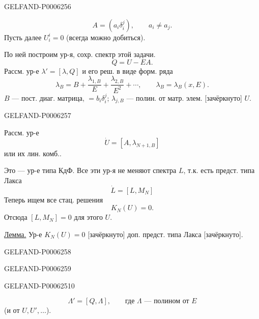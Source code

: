 \begin{GelfandAdjacentEvidence}{GELFAND-P000625}{6}

\[
A=(a_i\delta_i^j),\qquad a_i\ne a_j.
\]
Пусть далее \(U_i^i=0\) (всегда можно добиться).

По ней построим ур-я, сохр. спектр этой задачи.
\[
Q=U-EA.
\]
Рассм. ур-е \(\lambda'=[\lambda,Q]\) и его реш. в виде форм. ряда
\begin{equation*}
\lambda_B=B+\frac{\lambda_{1,B}}{E}+\frac{\lambda_{2,B}}{E^2}+\cdots,
\qquad\lambda_B=\lambda_B(x,E).\tag{3}
\end{equation*}
\(B\) --- пост. диаг. матрица, \(=b_i\delta_i^j\);
\(\lambda_{j,B}\) --- полин. от матр. элем. [зачёркнуто] \(U\).
\end{GelfandAdjacentEvidence}
\begin{GelfandAdjacentEvidence}{GELFAND-P000625}{7}


Рассм. ур-е
\begin{equation*}
\dot U=[A,\lambda_{N+1,B}]\tag{4}
\end{equation*}
или их лин. комб..

Это --- ур-е типа КдФ.
Все эти ур-я не меняют спектра \(L\), т.к. есть предст. типа Лакса
\begin{equation*}
\dot L=[L,M_N]\tag{5}
\end{equation*}
Теперь ищем все стац. решения
\begin{equation*}
K_N(U)=0.\tag{6}
\end{equation*}
Отсюда \([L,M_N]=0\) для этого \(U\).

\underline{Лемма.}
Ур-е \(K_N(U)=0\) [зачёркнуто] доп. предст. типа Лакса [зачёркнуто].
\end{GelfandAdjacentEvidence}
\begin{GelfandAdjacentEvidence}{GELFAND-P000625}{8}

\end{GelfandAdjacentEvidence}
\begin{GelfandAdjacentEvidence}{GELFAND-P000625}{9}

\end{GelfandAdjacentEvidence}
\begin{GelfandAdjacentEvidence}{GELFAND-P000625}{10}

\begin{equation*}
\Lambda'=[Q,\Lambda],\qquad\text{где }\Lambda\text{ --- полином от }E\tag{7}
\end{equation*}
(и от \(U,U',\ldots\)).
\end{GelfandAdjacentEvidence}
